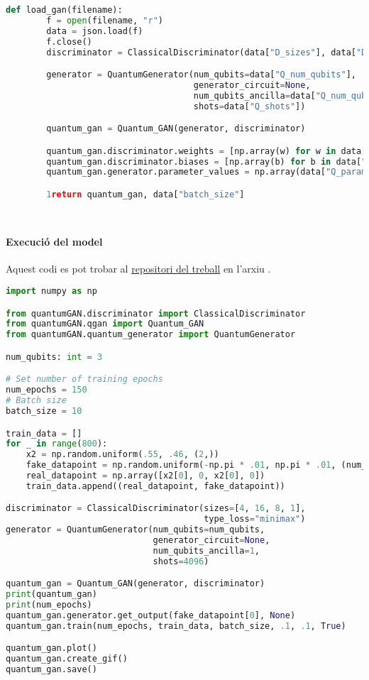 \begin{lstlisting}[language=Python, caption=Codi per la definició del model]
	def load_gan(filename):
		f = open(filename, "r")
		data = json.load(f)
		f.close()
		discriminator = ClassicalDiscriminator(data["D_sizes"], data["D_loss"])

		generator = QuantumGenerator(num_qubits=data["Q_num_qubits"],
									 generator_circuit=None,
									 num_qubits_ancilla=data["Q_num_qubits_ancilla"],
									 shots=data["Q_shots"])

		quantum_gan = Quantum_GAN(generator, discriminator)

		quantum_gan.discriminator.weights = [np.array(w) for w in data["D_weights"]]
		quantum_gan.discriminator.biases = [np.array(b) for b in data["D_biases"]]
		quantum_gan.generator.parameter_values = np.array(data["Q_parameters"])

		1return quantum_gan, data["batch_size"]
	
	
\end{lstlisting}

\paragraph{Execució del model}
\label{lst:main}
Aquest codi es pot trobar al \href{https://github.com/tomiock/qGAN}{repositori del treball} en l'arxiu . 

\begin{lstlisting}[language=Python, caption=Codi final pel generador]
import numpy as np

from quantumGAN.discriminator import ClassicalDiscriminator
from quantumGAN.qgan import Quantum_GAN
from quantumGAN.quantum_generator import QuantumGenerator

num_qubits: int = 3

# Set number of training epochs
num_epochs = 150
# Batch size
batch_size = 10

train_data = []
for _ in range(800):
	x2 = np.random.uniform(.55, .46, (2,))
	fake_datapoint = np.random.uniform(-np.pi * .01, np.pi * .01, (num_qubits,))
	real_datapoint = np.array([x2[0], 0, x2[0], 0])
	train_data.append((real_datapoint, fake_datapoint))

discriminator = ClassicalDiscriminator(sizes=[4, 16, 8, 1],
									   type_loss="minimax")
generator = QuantumGenerator(num_qubits=num_qubits,
							 generator_circuit=None,
							 num_qubits_ancilla=1,
							 shots=4096)

quantum_gan = Quantum_GAN(generator, discriminator)
print(quantum_gan)
print(num_epochs)
quantum_gan.generator.get_output(fake_datapoint[0], None)
quantum_gan.train(num_epochs, train_data, batch_size, .1, .1, True)

quantum_gan.plot()
quantum_gan.create_gif()
quantum_gan.save()

\end{lstlisting}


